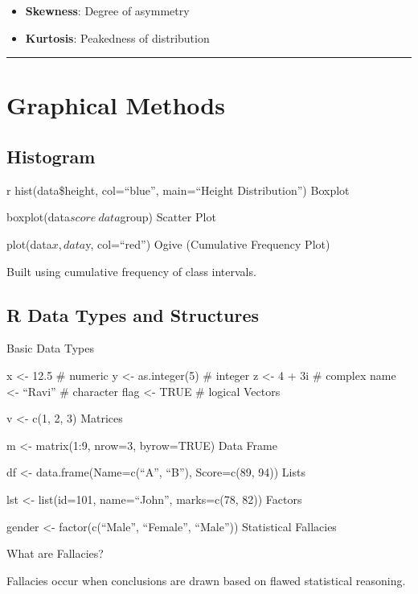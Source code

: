 \documentclass[
  letterpaper,
  DIV=11,
  numbers=noendperiod]{scrreprt}
\providecommand{\tightlist}{%
  \setlength{\itemsep}{0pt}\setlength{\parskip}{0pt}}
\begin{document}
\begin{itemize}
\tightlist
\item
  \textbf{Skewness}: Degree of asymmetry
\item
  \textbf{Kurtosis}: Peakedness of distribution
\end{itemize}

\begin{center}\rule{0.5\linewidth}{0.5pt}\end{center}

\section{Graphical Methods}\label{graphical-methods}

\subsection{Histogram}\label{histogram-1}

r hist(data\$height, col=``blue'', main=``Height Distribution'') Boxplot

boxplot(data\(score ~ data\)group) Scatter Plot

plot(data\(x, data\)y, col=``red'') Ogive (Cumulative Frequency Plot)

Built using cumulative frequency of class intervals.

\subsection{R Data Types and
Structures}\label{r-data-types-and-structures}

Basic Data Types

x \textless- 12.5 \# numeric y \textless- as.integer(5) \# integer z
\textless- 4 + 3i \# complex name \textless- ``Ravi'' \# character flag
\textless- TRUE \# logical Vectors

v \textless- c(1, 2, 3) Matrices

m \textless- matrix(1:9, nrow=3, byrow=TRUE) Data Frame

df \textless- data.frame(Name=c(``A'', ``B''), Score=c(89, 94)) Lists

lst \textless- list(id=101, name=``John'', marks=c(78, 82)) Factors

gender \textless- factor(c(``Male'', ``Female'', ``Male'')) Statistical
Fallacies

What are Fallacies?

Fallacies occur when conclusions are drawn based on flawed statistical
reasoning.
\end{document}
